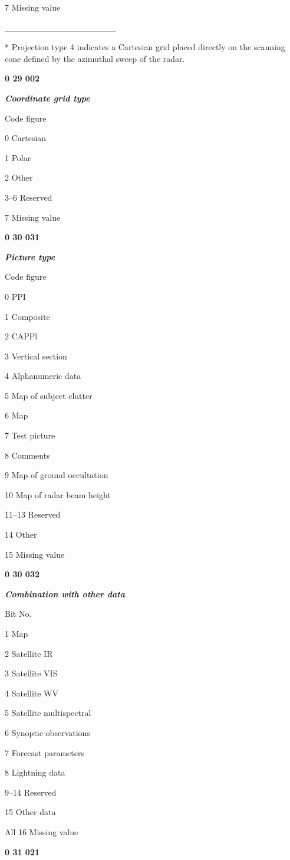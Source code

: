7 Missing value

\_\_\_\_\_\_\_\_\_\_\_\_\_\_\_\_\_\_

* Projection type 4 indicates a Cartesian grid placed directly on the scanning cone defined by the azimuthal sweep of the radar.

\textbf{0 29 002}

\emph{\textbf{Coordinate grid type}}

Code figure

0 Cartesian

1 Polar

2 Other

3--6 Reserved

7 Missing value

\textbf{0 30 031}

\emph{\textbf{Picture type}}

Code figure

0 PPI

1 Composite

2 CAPPl

3 Vertical section

4 Alphanumeric data

5 Map of subject clutter

6 Map

7 Test picture

8 Comments

9 Map of ground occultation

10 Map of radar beam height

11--13 Reserved

14 Other

15 Missing value

\textbf{0 30 032}

\emph{\textbf{Combination with other data}}

Bit No.

1 Map

2 Satellite IR

3 Satellite VIS

4 Satellite WV

5 Satellite multispectral

6 Synoptic observations

7 Forecast parameters

8 Lightning data

9--14 Reserved

15 Other data

All 16 Missing value

\textbf{0 31 021}

